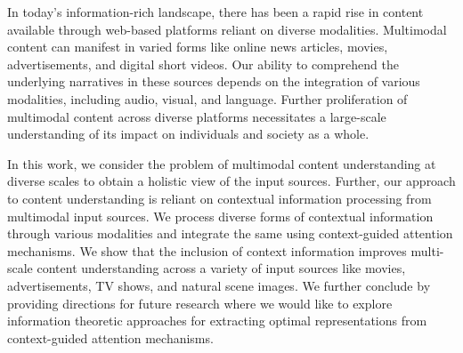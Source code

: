 
In today's information-rich landscape, there has been a rapid rise in content available through web-based platforms reliant on diverse modalities. Multimodal content can manifest in varied forms like online news articles, movies, advertisements, and digital short videos. Our ability to comprehend the underlying narratives in these sources depends on the integration of various modalities, including audio, visual, and language. Further proliferation of multimodal content across diverse platforms necessitates a large-scale understanding of its impact on individuals and society as a whole. 
\par
In this work, we consider the problem of multimodal content understanding at diverse scales to obtain a holistic view of the input sources. Further, our approach to content understanding is reliant on contextual information processing from multimodal input sources. We process diverse forms of contextual information through various modalities and integrate the same using context-guided attention mechanisms. We show that the inclusion of context information improves multi-scale content understanding across a variety of input sources like movies, advertisements, TV shows, and natural scene images. We further conclude by providing directions for future research where we would like to explore information theoretic approaches for extracting optimal representations from context-guided attention mechanisms.






